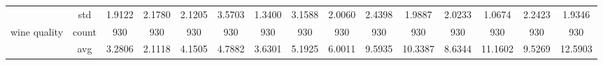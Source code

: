 \begin{table}[H]
{\begin{tabular}{rcccc|c|c|c|c|c|ccccc}
			                                                                               & std                                    & 1.9122                                                                             & 2.1780                                                                    & 2.1205                                                                    & 3.5703                                         & 1.3400                                                                    & 3.1588                                       & 2.0060                                      & 2.4398                                         & 1.9887                                         & 2.0233                                          & 1.0674                                          & 2.2423                                         & 1.9346                                         \\
			wine quality                                                                   & count                                  & 930                                                                                & 930                                                                       & 930                                                                       & 930                                            & 930                                                                       & 930                                          & 930                                         & 930                                            & 930                                            & 930                                             & 930                                             & 930                                            & 930                                            \\
			                                                                               & avg                                    & 3.2806                                                                             & \cellcolor[rgb]{ .776,  .937,  .808}\textcolor[rgb]{ 0,  .38,  0}{2.1118} & 4.1505                                                                    & 4.7882                                         & 3.6301                                                                    & 5.1925                                       & 6.0011                                      & 9.5935                                         & 10.3387                                        & 8.6344                                          & 11.1602                                         & 9.5269                                         & 12.5903                                        \\

\end{tabular}}
\end{table}
